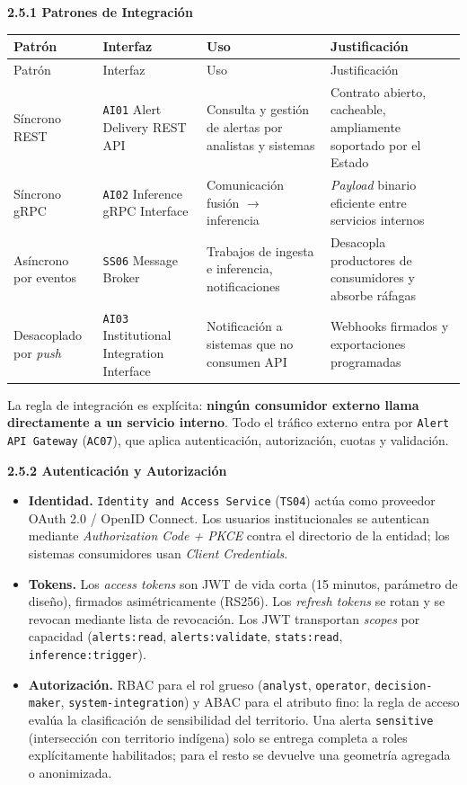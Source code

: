 \documentclass{article}
\newcommand{\mdhfour}[1]{\par\medskip\noindent\textbf{#1}\par\nobreak\smallskip}
\begin{document}
\mdhfour{2.5.1 Patrones de Integración}

{\small
\begin{longtable}{@{}L{0.82in}L{1.31in}L{1.75in}L{2.06in}@{}}
\toprule
Patrón & Interfaz & Uso & Justificación \\
\midrule
\endfirsthead
\toprule
Patrón & Interfaz & Uso & Justificación \\
\midrule
\endhead
\bottomrule
\endlastfoot
Síncrono REST & \texttt{AI01} Alert Delivery REST API & Consulta y gestión de alertas por analistas y sistemas & Contrato abierto, cacheable, ampliamente soportado por el Estado \\
Síncrono gRPC & \texttt{AI02} Inference gRPC Interface & Comunicación fusión \ensuremath{\rightarrow} inferencia & \emph{Payload} binario eficiente entre servicios internos \\
Asíncrono por eventos & \texttt{SS06} Message Broker & Trabajos de ingesta e inferencia, notificaciones & Desacopla productores de consumidores y absorbe ráfagas \\
Desacoplado por \emph{push} & \texttt{AI03} Institutional Integration Interface & Notificación a sistemas que no consumen API & Webhooks firmados y exportaciones programadas \\
\end{longtable}
}

La regla de integración es explícita: \textbf{ningún consumidor externo llama directamente a un servicio interno}. Todo el tráfico externo entra por \texttt{Alert API Gateway} (\texttt{AC07}), que aplica autenticación, autorización, cuotas y validación.

\mdhfour{2.5.2 Autenticación y Autorización}

\begin{itemize}
  \item \textbf{Identidad.} \texttt{Identity and Access Service} (\texttt{TS04}) actúa como proveedor OAuth 2.0 / OpenID Connect. Los usuarios institucionales se autentican mediante \emph{Authorization Code + PKCE} contra el directorio de la entidad; los sistemas consumidores usan \emph{Client Credentials}.
  \item \textbf{Tokens.} Los \emph{access tokens} son JWT de vida corta (15 minutos, parámetro de diseño), firmados asimétricamente (RS256). Los \emph{refresh tokens} se rotan y se revocan mediante lista de revocación. Los JWT transportan \emph{scopes} por capacidad (\texttt{alerts:\allowbreak{}read}, \texttt{alerts:\allowbreak{}validate}, \texttt{stats:\allowbreak{}read}, \texttt{inference:\allowbreak{}trigger}).
  \item \textbf{Autorización.} RBAC para el rol grueso (\texttt{analyst}, \texttt{operator}, \texttt{decision-\allowbreak{}maker}, \texttt{system-\allowbreak{}integration}) y ABAC para el atributo fino: la regla de acceso evalúa la clasificación de sensibilidad del territorio. Una alerta \texttt{sensitive} (intersección con territorio indígena) solo se entrega completa a roles explícitamente habilitados; para el resto se devuelve una geometría agregada o anonimizada.
\end{itemize}
\end{document}
